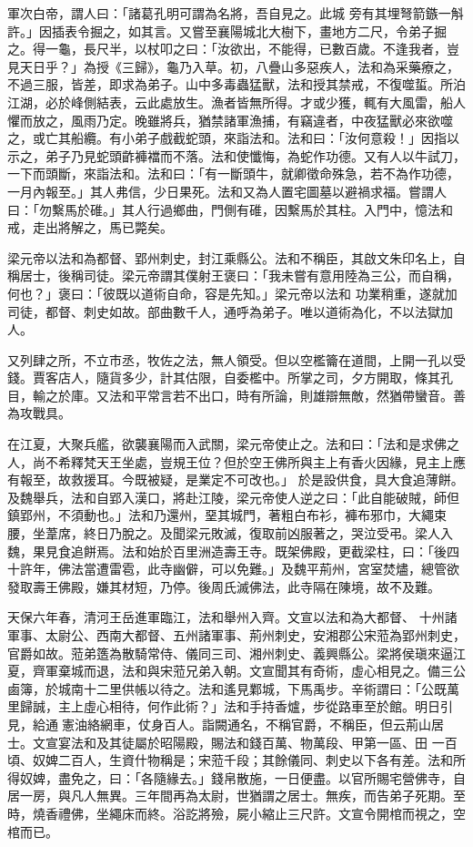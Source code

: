 \begin{pinyinscope}
 軍次白帝，謂人曰：「諸葛孔明可謂為名將，吾自見之。此城
 旁有其埋弩箭鏃一斛許。」因插表令掘之，如其言。又嘗至襄陽城北大樹下，畫地方二尺，令弟子掘之。得一龜，長尺半，以杖叩之曰：「汝欲出，不能得，已數百歲。不逢我者，豈見天日乎？」為授《三歸》，龜乃入草。初，八疊山多惡疾人，法和為采藥療之，不過三服，皆差，即求為弟子。山中多毒蟲猛獸，法和授其禁戒，不復噬蜇。所泊江湖，必於峰側結表，云此處放生。漁者皆無所得。才或少獲，輒有大風雷，船人懼而放之，風雨乃定。晚雖將兵，猶禁諸軍漁捕，有竊違者，中夜猛獸必來欲噬之，或亡其船纜。有小弟子戲截蛇頭，來詣法和。法和曰：「汝何意殺！」因指以
 示之，弟子乃見蛇頭齚褲襠而不落。法和使懺悔，為蛇作功德。又有人以牛試刀，一下而頭斷，來詣法和。法和曰：「有一斷頭牛，就卿徵命殊急，若不為作功德，一月內報至。」其人弗信，少日果死。法和又為人置宅圖墓以避禍求福。嘗謂人曰：「勿繫馬於碓。」其人行過鄉曲，門側有碓，因繫馬於其柱。入門中，憶法和戒，走出將解之，馬已斃矣。



 梁元帝以法和為都督、郢州刺史，封江乘縣公。法和不稱臣，其啟文朱印名上，自稱居士，後稱司徒。梁元帝謂其僕射王褒曰：「我未嘗有意用陸為三公，而自稱，何也？」褒曰：「彼既以道術自命，容是先知。」梁元帝以法和
 功業稍重，遂就加司徒，都督、刺史如故。部曲數千人，通呼為弟子。唯以道術為化，不以法獄加人。



 又列肆之所，不立市丞，牧佐之法，無人領受。但以空檻籥在道間，上開一孔以受錢。賈客店人，隨貨多少，計其估限，自委檻中。所掌之司，夕方開取，條其孔目，輸之於庫。又法和平常言若不出口，時有所論，則雄辯無敵，然猶帶蠻音。善為攻戰具。



 在江夏，大聚兵艦，欲襲襄陽而入武關，梁元帝使止之。法和曰：「法和是求佛之人，尚不希釋梵天王坐處，豈規王位？但於空王佛所與主上有香火因緣，見主上應有報至，故救援耳。今既被疑，是業定不可改也。」
 於是設供食，具大食追薄餅。及魏舉兵，法和自郢入漢口，將赴江陵，梁元帝使人逆之曰：「此自能破賊，師但鎮郢州，不須動也。」法和乃還州，堊其城門，著粗白布衫，褲布邪巾，大繩束腰，坐葦席，終日乃脫之。及聞梁元敗滅，復取前凶服著之，哭泣受弔。梁人入魏，果見食追餅焉。法和始於百里洲造壽王寺。既架佛殿，更截梁柱，曰：「後四十許年，佛法當遭雷雹，此寺幽僻，可以免難。」及魏平荊州，宮室焚燼，總管欲發取壽王佛殿，嫌其材短，乃停。後周氏滅佛法，此寺隔在陳境，故不及難。



 天保六年春，清河王岳進軍臨江，法和舉州入齊。文宣以法和為大都督、
 十州諸軍事、太尉公、西南大都督、五州諸軍事、荊州刺史，安湘郡公宋蒞為郢州刺史，官爵如故。蒞弟簉為散騎常侍、儀同三司、湘州刺史、義興縣公。梁將侯瑱來逼江夏，齊軍棄城而退，法和與宋蒞兄弟入朝。文宣聞其有奇術，虛心相見之。備三公鹵簿，於城南十二里供帳以待之。法和遙見鄴城，下馬禹步。辛術謂曰：「公既萬里歸誠，主上虛心相待，何作此術？」法和手持香爐，步從路車至於館。明日引見，給通憲油絡網車，仗身百人。詣闕通名，不稱官爵，不稱臣，但云荊山居士。文宣宴法和及其徒屬於昭陽殿，賜法和錢百萬、物萬段、甲第一區、田
 一百頃、奴婢二百人，生資什物稱是；宋蒞千段；其餘儀同、刺史以下各有差。法和所得奴婢，盡免之，曰：「各隨緣去。」錢帛散施，一日便盡。以官所賜宅營佛寺，自居一房，與凡人無異。三年間再為太尉，世猶謂之居士。無疾，而告弟子死期。至時，燒香禮佛，坐繩床而終。浴訖將殮，屍小縮止三尺許。文宣令開棺而視之，空棺而已。




\end{pinyinscope}
